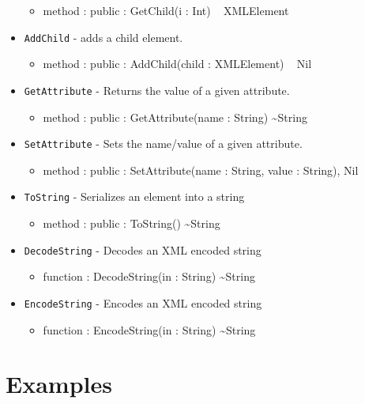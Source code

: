 \documentclass[12pt]{article}
\begin{document}
\begin{itemize}
\begin{itemize}
  \item method : public : GetChild(i : Int) ~ XMLElement
  \end{itemize}
\item \texttt{AddChild} - adds a child element.
  \begin{itemize}
  \item method : public : AddChild(child : XMLElement) ~ Nil
  \end{itemize}
\item \texttt{GetAttribute} - Returns the value of a given attribute.
  \begin{itemize}
  \item method : public : GetAttribute(name : String) \textasciitilde String
  \end{itemize}
\item \texttt{SetAttribute} - Sets the name/value of a given
  attribute.
  \begin{itemize}
  \item method : public : SetAttribute(name : String, value : String),
    Nil
  \end{itemize}
\item \texttt{ToString} - Serializes an element into a string
  \begin{itemize}
  \item method : public : ToString() \textasciitilde String
  \end{itemize}
\item \texttt{DecodeString} - Decodes an XML encoded string
  \begin{itemize}
  \item function : DecodeString(in : String) \textasciitilde String
  \end{itemize}
\item \texttt{EncodeString} - Encodes an XML encoded string
  \begin{itemize}
  \item function : EncodeString(in : String) \textasciitilde String
  \end{itemize}
\end{itemize}

\section{Examples}
\end{document}
